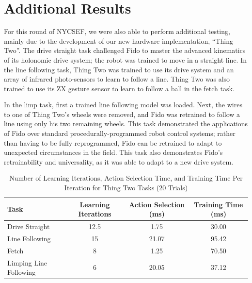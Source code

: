 \documentclass[letterpaper,11pt]{article}
\begin{document}
	\section*{Additional Results}

	For this round of NYCSEF, we were also able to perform additional testing, mainly due to the development of our new hardware implementation, ``Thing Two''.  The drive straight task challenged Fido to master the advanced kinematics of its holonomic drive system; the robot was trained to move in a straight line.  In the line following task, Thing Two was trained to use its drive system and an array of infrared photo-sensors to learn to follow a line.  Thing Two was also trained to use its ZX gesture sensor to learn to follow a ball in the fetch task.   

	In the limp task, first a trained line following model was loaded.  Next, the wires to one of Thing Two's wheels were removed, and Fido was retrained to follow a line using only his two remaining wheels.  This task demonstrated the applications of Fido over standard procedurally-programmed robot control systems; rather than having to be fully reprogrammed, Fido can be retrained to adapt to unexpected circumstances in the field.  This task also demonstrates Fido's retrainability and universality, as it was able to adapt to a new drive system.

	\begin{table}[ht]
		\centering
		\begin{tabular}{@{}lccc@{}}
			\toprule
			Task                   & Learning Iterations & Action Selection (ms) & Training Time (ms) \\ \midrule
			Drive Straight         & 12.5                   & 1.75                    & 30.00                  \\
			Line Following         & 15                  & 21.07                    & 95.42                \\
			Fetch                  & 8                  & 1.25                     & 70.50                 \\
			Limping Line Following & 6                   & 20.05                    & 37.12                 \\ \bottomrule
		\end{tabular}
		\caption{Number of Learning Iterations, Action Selection Time, and Training Time Per Iteration for Thing Two Tasks (20 Trials)}
		\label{tab:data1}
	\end{table}
\end{document}
